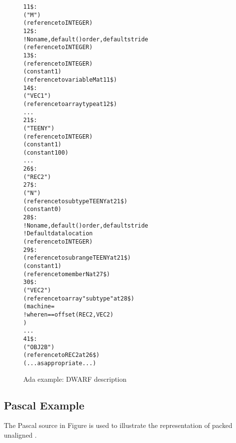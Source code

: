 \begin{figure}[p]
\begin{dwflisting}
\begin{alltt}
11\$:  \DWTAGvariable
          \DWATname("M")
          \DWATtype(reference to INTEGER)
12\$:  \DWTAGarraytype
          ! No name, default () order, default stride
          \DWATtype(reference to INTEGER)
13\$:      \DWTAGsubrangetype
              \DWATtype(reference to INTEGER)
              \DWATlowerbound(constant 1)
              \DWATupperbound(reference to variable M at 11\$)
14\$:  \DWTAGvariable
          \DWATname("VEC1")
          \DWATtype(reference to array type at 12\$)
      . . .
21\$:  \DWTAGsubrangetype
          \DWATname("TEENY")
          \DWATtype(reference to INTEGER)
          \DWATlowerbound(constant 1)
          \DWATupperbound(constant 100)
      . . .
26\$:  \DWTAGstructuretype
          \DWATname("REC2")
27\$:      \DWTAGmember
              \DWATname("N")
              \DWATtype(reference to subtype TEENY at 21\$)
              \DWATdatamemberlocation(constant 0)
28\$:      \DWTAGarraytype
              ! No name, default () order, default stride
              ! Default data location
              \DWATtype(reference to INTEGER)
29\$:          \DWTAGsubrangetype
                  \DWATtype(reference to subrange TEENY at 21\$)
                  \DWATlowerbound(constant 1)
                  \DWATupperbound(reference to member N at 27\$)
30\$:      \DWTAGmember
              \DWATname("VEC2")
              \DWATtype(reference to array "subtype" at 28\$)
              \DWATdatamemberlocation(machine=
                  \DWOPlitn                ! where n == offset(REC2, VEC2)
                  \DWOPplus)
      . . .
41\$:  \DWTAGvariable
          \DWATname("OBJ2B")
          \DWATtype(reference to REC2 at 26\$)
          \DWATlocation(...as appropriate...)
\end{alltt}
\end{dwflisting}
\caption{Ada example: DWARF description}
\label{fig:adaexampledwarfdescription}
\end{figure}

\clearpage

\subsection{Pascal Example}
\label{app:pascalexample}
The Pascal  source in 
Figure 
is used to illustrate the representation of packed unaligned
.

